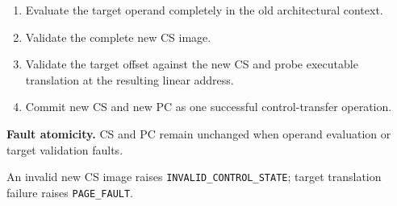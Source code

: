 \begin{enumerate}
\item Evaluate the target operand completely in the old architectural context.
\item Validate the complete new CS image.
\item Validate the target offset against the new CS and probe executable translation at the resulting linear address.
\item Commit new CS and new PC as one successful control-transfer operation.
\end{enumerate}

\textbf{Fault atomicity.} CS and PC remain unchanged when operand evaluation or target validation faults.

An invalid new CS image raises \texttt{INVALID\_CONTROL\_STATE}; target translation failure raises
\texttt{PAGE\_FAULT}.
